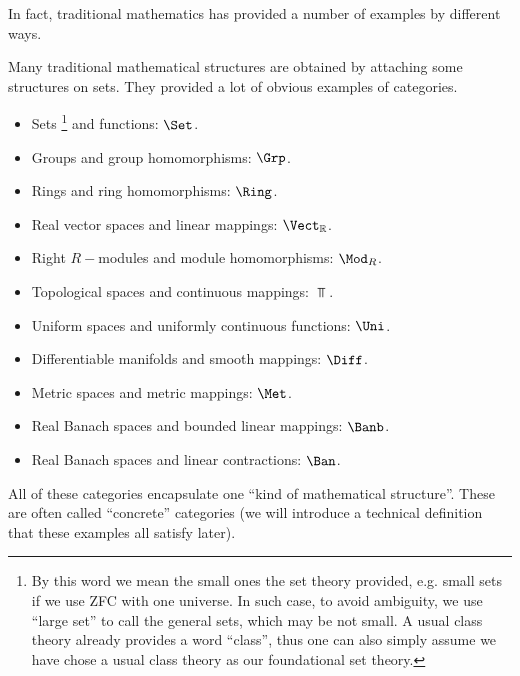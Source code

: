   In fact, traditional mathematics has provided a number of examples by different ways.
  \begin{exam}
    Many traditional mathematical structures are obtained by attaching some structures on sets. They provided a lot of obvious examples of categories.
    \begin{itemize}
      \item Sets
      \footnote{By this word we mean the small ones the set theory provided, e.g. small sets if we use ZFC with one universe. In such case, to avoid ambiguity, we use ``large set'' to call the general sets, which may be not small. A usual class theory already provides a word ``class'', thus one can also simply assume we have chose a usual class theory as our foundational set theory.}
       and functions: $\Set$.
      \item Groups and group homomorphisms: $\Grp$.
      \item Rings and ring homomorphisms: $\Ring$.
      \item Real vector spaces and linear mappings: $\Vect_{\RR}$.
      \item Right $R-$modules and module homomorphisms: $\Mod_R$.
      \item Topological spaces and continuous mappings: $\Top$.
      \item Uniform spaces and uniformly continuous functions: $\Uni$.
      \item Differentiable manifolds and smooth mappings: $\Diff$.
      \item Metric spaces and metric mappings: $\Met$.
      \item Real Banach spaces and bounded linear mappings: $\Banb$.
      \item Real Banach spaces and linear contractions: $\Ban$.
    \end{itemize}
    All of these categories encapsulate one ``kind of mathematical structure''. These are often called ``concrete'' categories (we will introduce a technical definition that these examples all satisfy later).
  \end{exam}
